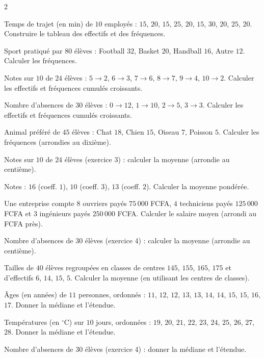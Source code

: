 \begin{multicols}{2}

\exo{} Temps de trajet (en min) de $10$ employés : $15$, $20$, $15$, $25$, $20$,
$15$, $30$, $20$, $25$, $20$. Construire le tableau des effectifs et des fréquences.

\exo{} Sport pratiqué par $80$ élèves : Football $32$, Basket $20$, Handball $16$,
Autre $12$. Calculer les fréquences.

\exo{} Notes sur $10$ de $24$ élèves : $5\to2$, $6\to3$, $7\to6$, $8\to7$, $9\to4$,
$10\to2$. Calculer les effectifs et fréquences cumulés croissants.

\exo{} Nombre d'absences de $30$ élèves : $0\to12$, $1\to10$, $2\to5$, $3\to3$.
Calculer les effectifs et fréquences cumulés croissants.

\exo{} Animal préféré de $45$ élèves : Chat $18$, Chien $15$, Oiseau $7$, Poisson
$5$. Calculer les fréquences (arrondies au dixième).

\exo{} Notes sur $10$ de $24$ élèves (exercice 3) : calculer la moyenne (arrondie
au centième).

\exo{} Notes : $16$ (coeff. $1$), $10$ (coeff. $3$), $13$ (coeff. $2$). Calculer la
moyenne pondérée.

\exo{} Une entreprise compte $8$ ouvriers payés $75\,000$ FCFA, $4$ techniciens
payés $125\,000$ FCFA et $3$ ingénieurs payés $250\,000$ FCFA. Calculer le salaire moyen
(arrondi au FCFA près).

\exo{} Nombre d'absences de $30$ élèves (exercice 4) : calculer la moyenne
(arrondie au centième).

\exo{} Tailles de $40$ élèves regroupées en classes de centres $145$, $155$, $165$,
$175$ et d'effectifs $6$, $14$, $15$, $5$. Calculer la moyenne (en utilisant les centres de
classes).

\exo{} Âges (en années) de $11$ personnes, ordonnés :
$11$, $12$, $12$, $13$, $13$, $14$, $14$, $15$, $15$, $16$, $17$. Donner la médiane et
l'étendue.

\exo{} Températures (en $^{\circ}$C) sur $10$ jours, ordonnées :
$19$, $20$, $21$, $22$, $23$, $24$, $25$, $26$, $27$, $28$. Donner la médiane et
l'étendue.

\exo{} Nombre d'absences de $30$ élèves (exercice 4) : donner la médiane et
l'étendue.


\end{multicols}
